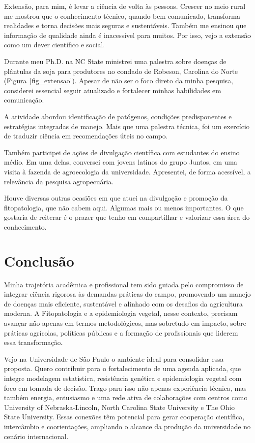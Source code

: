\documentclass[12pt,a4paper,oneside]{book}
\newcommand{\USP}{Universidade de São Paulo}
\newcommand{\UNL}{University of Nebraska-Lincoln}
\newcommand{\NCState}{North Carolina State University}
\newcommand{\OSU}{The Ohio State University}
\begin{document}
Extensão, para mim, é levar a ciência de volta às pessoas. Crescer no meio rural me mostrou que o conhecimento técnico, 
quando bem comunicado, transforma realidades e torna decisões mais seguras e sustentáveis. Também me ensinou que 
informação de qualidade ainda é inacessível para muitos. Por isso, vejo a extensão como um dever científico e social.

Durante meu Ph.D. na NC State ministrei uma palestra sobre doenças de plântulas da soja para produtores no condado de Robeson, 
Carolina do Norte (Figura~\ref{fig_extensao}). Apesar de não ser o foco direto da minha pesquisa, considerei essencial 
seguir atualizado e fortalecer minhas habilidades em comunicação.

A atividade abordou identificação de patógenos, condições predisponentes e estratégias integradas de manejo. 
Mais que uma palestra técnica, foi um exercício de traduzir ciência em recomendações úteis no campo.

Também participei de ações de divulgação científica com estudantes do ensino médio. Em uma delas, conversei 
com jovens latinos do grupo Juntos, em uma visita à fazenda de agroecologia da universidade. Apresentei, de 
forma acessível, a relevância da pesquisa agropecuária.

Houve diversas outras ocasiões em que atuei na divulgação e promoção da fitopatologia, que não cabem aqui. Algumas mais ou menos importantes.
O que gostaria de reiterar é o prazer que tenho em compartilhar e valorizar essa área do conhecimento.

  


\chapter{Conclusão}
\label{cap_conclusao}

Minha trajetória acadêmica e profissional tem sido guiada pelo compromisso de integrar ciência rigorosa às demandas 
práticas do campo, promovendo um manejo de doenças mais eficiente, sustentável e alinhado com os desafios da 
agricultura moderna. A Fitopatologia e a epidemiologia vegetal, nesse contexto, precisam avançar não apenas 
em termos metodológicos, mas sobretudo em impacto, sobre práticas agrícolas, políticas públicas 
e a formação de profissionais que liderem essa transformação.

Vejo na \USP{} o ambiente ideal para consolidar essa proposta. Quero contribuir para o fortalecimento de 
uma agenda aplicada, que integre modelagem estatística, resistência genética e epidemiologia vegetal 
com foco em tomada de decisão. Trago para isso não apenas experiência técnica, mas também energia, 
entusiasmo e uma rede ativa de colaborações com centros como \UNL{}, \NCState{} e \OSU{}. Essas conexões 
têm potencial para gerar cooperação científica, intercâmbio e coorientações, ampliando o alcance da
produção da universidade no cenário internacional.
\end{document}
